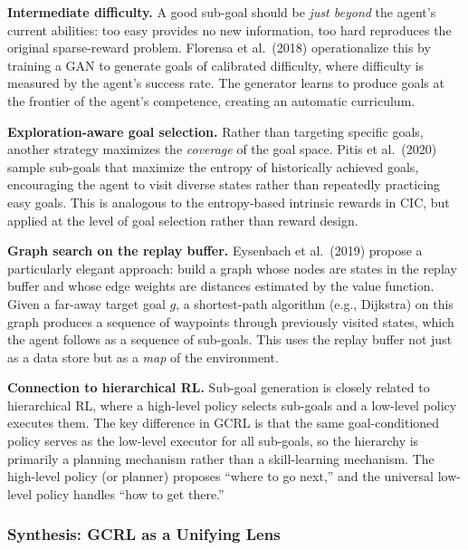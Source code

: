\documentclass[11pt, letterpaper]{article}
\begin{document}
\begin{remark}
    \textbf{Intermediate difficulty.} A good sub-goal should be \textit{just beyond} the agent's current abilities: too easy provides no new information, too hard reproduces the original sparse-reward problem. Florensa et al.\ (2018) operationalize this by training a GAN to generate goals of calibrated difficulty, where difficulty is measured by the agent's success rate. The generator learns to produce goals at the frontier of the agent's competence, creating an automatic curriculum.
 
    \textbf{Exploration-aware goal selection.} Rather than targeting specific goals, another strategy maximizes the \textit{coverage} of the goal space. Pitis et al.\ (2020) sample sub-goals that maximize the entropy of historically achieved goals, encouraging the agent to visit diverse states rather than repeatedly practicing easy goals. This is analogous to the entropy-based intrinsic rewards in CIC, but applied at the level of goal selection rather than reward design.
 
    \textbf{Graph search on the replay buffer.} Eysenbach et al.\ (2019) propose a particularly elegant approach: build a graph whose nodes are states in the replay buffer and whose edge weights are distances estimated by the value function. Given a far-away target goal \(g\), a shortest-path algorithm (e.g., Dijkstra) on this graph produces a sequence of waypoints through previously visited states, which the agent follows as a sequence of sub-goals. This uses the replay buffer not just as a data store but as a \textit{map} of the environment.
 
    \textbf{Connection to hierarchical RL.} Sub-goal generation is closely related to hierarchical RL, where a high-level policy selects sub-goals and a low-level policy executes them. The key difference in GCRL is that the same goal-conditioned policy serves as the low-level executor for all sub-goals, so the hierarchy is primarily a planning mechanism rather than a skill-learning mechanism. The high-level policy (or planner) proposes ``where to go next,'' and the universal low-level policy handles ``how to get there.''
\end{remark}
 
\subsubsection{Synthesis: GCRL as a Unifying Lens}
 
\end{document}
